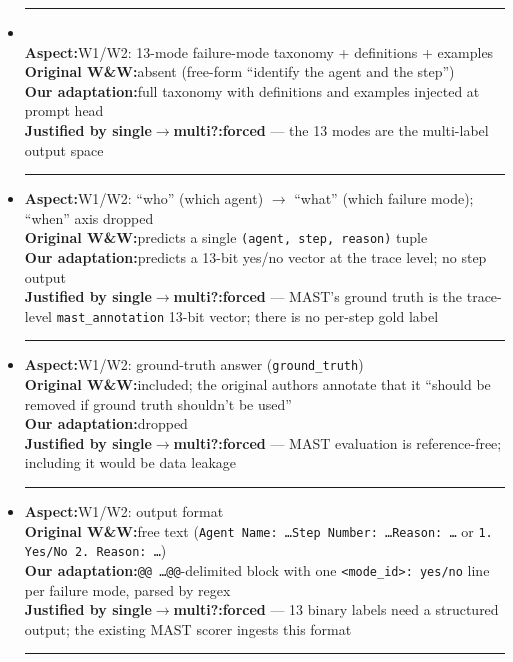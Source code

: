 \begin{itemize}\setlength{\itemsep}{0.4em}

\item \noindent\rule{\linewidth}{0.4pt}\\
      \textbf{Aspect:}\enspace \textsc{W1}/\textsc{W2}: 13-mode failure-mode taxonomy + definitions + examples\\
      \textbf{Original W\&W:}\enspace absent (free-form ``identify the agent and the step'')\\
      \textbf{Our adaptation:}\enspace full taxonomy with definitions and examples injected at prompt head\\
      \textbf{Justified by single$\to$multi?:}\enspace \textbf{forced} --- the 13 modes are the multi-label output space\\
      \rule{\linewidth}{0.4pt}

\item \textbf{Aspect:}\enspace \textsc{W1}/\textsc{W2}: ``who'' (which agent) $\to$ ``what'' (which failure mode); ``when'' axis dropped\\
      \textbf{Original W\&W:}\enspace predicts a single \texttt{(agent, step, reason)} tuple\\
      \textbf{Our adaptation:}\enspace predicts a 13-bit yes/no vector at the trace level; no step output\\
      \textbf{Justified by single$\to$multi?:}\enspace \textbf{forced} --- MAST's ground truth is the trace-level \texttt{mast\_annotation} 13-bit vector; there is no per-step gold label\\
      \rule{\linewidth}{0.4pt}

\item \textbf{Aspect:}\enspace \textsc{W1}/\textsc{W2}: ground-truth answer (\texttt{ground\_truth})\\
      \textbf{Original W\&W:}\enspace included; the original authors annotate that it ``should be removed if ground truth shouldn't be used''\\
      \textbf{Our adaptation:}\enspace dropped\\
      \textbf{Justified by single$\to$multi?:}\enspace \textbf{forced} --- MAST evaluation is reference-free; including it would be data leakage\\
      \rule{\linewidth}{0.4pt}

\item \textbf{Aspect:}\enspace \textsc{W1}/\textsc{W2}: output format\\
      \textbf{Original W\&W:}\enspace free text (\texttt{Agent Name: \ldots Step Number: \ldots Reason: \ldots} or \texttt{1. Yes/No 2. Reason: \ldots})\\
      \textbf{Our adaptation:}\enspace \texttt{@@ \ldots @@}-delimited block with one \texttt{<mode\_id>: yes/no} line per failure mode, parsed by regex\\
      \textbf{Justified by single$\to$multi?:}\enspace \textbf{forced} --- 13 binary labels need a structured output; the existing MAST scorer ingests this format\\
      \rule{\linewidth}{0.4pt}


\end{itemize}
